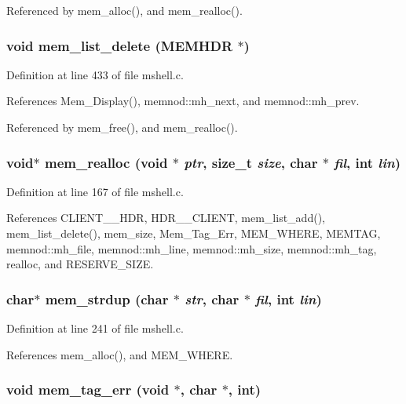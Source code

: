 Referenced by mem\_\-alloc(), and mem\_\-realloc().
\subsubsection{\setlength{\rightskip}{0pt plus 5cm}void mem\_\-list\_\-delete ({\bf MEMHDR} $\ast$)\hspace{0.3cm}{\tt  [static]}}\label{mshell_8c_a13}




Definition at line 433 of file mshell.c.

References Mem\_\-Display(), memnod::mh\_\-next, and memnod::mh\_\-prev.

Referenced by mem\_\-free(), and mem\_\-realloc().
\subsubsection{\setlength{\rightskip}{0pt plus 5cm}void$\ast$ mem\_\-realloc (void $\ast$ {\em ptr}, size\_\-t {\em size}, char $\ast$ {\em fil}, int {\em lin})}\label{mshell_8c_a15}




Definition at line 167 of file mshell.c.

References CLIENT\_\_\-HDR, HDR\_\_\-CLIENT, mem\_\-list\_\-add(), mem\_\-list\_\-delete(), mem\_\-size, Mem\_\-Tag\_\-Err, MEM\_\-WHERE, MEMTAG, memnod::mh\_\-file, memnod::mh\_\-line, memnod::mh\_\-size, memnod::mh\_\-tag, realloc, and RESERVE\_\-SIZE.
\subsubsection{\setlength{\rightskip}{0pt plus 5cm}char$\ast$ mem\_\-strdup (char $\ast$ {\em str}, char $\ast$ {\em fil}, int {\em lin})}\label{mshell_8c_a16}




Definition at line 241 of file mshell.c.

References mem\_\-alloc(), and MEM\_\-WHERE.
\subsubsection{\setlength{\rightskip}{0pt plus 5cm}void mem\_\-tag\_\-err (void $\ast$, char $\ast$, int)\hspace{0.3cm}{\tt  [static]}}\label{mshell_8c_a11}




